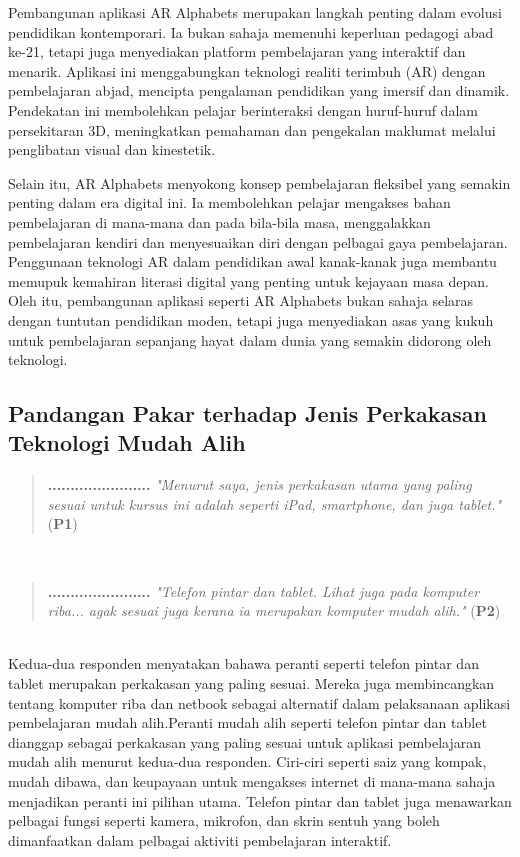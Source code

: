{{Pembangunan aplikasi AR Alphabets merupakan langkah penting dalam evolusi pendidikan kontemporari. Ia bukan sahaja memenuhi keperluan pedagogi abad ke-21, tetapi juga menyediakan platform pembelajaran yang interaktif dan menarik. Aplikasi ini menggabungkan teknologi realiti terimbuh (AR) dengan pembelajaran abjad, mencipta pengalaman pendidikan yang imersif dan dinamik. Pendekatan ini membolehkan pelajar berinteraksi dengan huruf-huruf dalam persekitaran 3D, meningkatkan pemahaman dan pengekalan maklumat melalui penglibatan visual dan kinestetik.

Selain itu, AR Alphabets menyokong konsep pembelajaran fleksibel yang semakin penting dalam era digital ini. Ia membolehkan pelajar mengakses bahan pembelajaran di mana-mana dan pada bila-bila masa, menggalakkan pembelajaran kendiri dan menyesuaikan diri dengan pelbagai gaya pembelajaran. Penggunaan teknologi AR dalam pendidikan awal kanak-kanak juga membantu memupuk kemahiran literasi digital yang penting untuk kejayaan masa depan. Oleh itu, pembangunan aplikasi seperti AR Alphabets bukan sahaja selaras dengan tuntutan pendidikan moden, tetapi juga menyediakan asas yang kukuh untuk pembelajaran sepanjang hayat dalam dunia yang semakin didorong oleh teknologi.

\subsection{Pandangan Pakar terhadap Jenis Perkakasan Teknologi Mudah Alih}

\begin{quote}\begin{center}\textbf{.......................} \textit{"Menurut saya, jenis perkakasan utama yang paling sesuai untuk kursus ini adalah seperti iPad, smartphone, dan juga tablet."} (\textbf{P1})\end{center}\end{quote}\\
\begin{quote}
\begin{center}
\textbf{.......................} \textit{"Telefon pintar dan tablet. Lihat juga pada komputer riba... agak sesuai juga kerana ia merupakan komputer mudah alih."} (\textbf{P2})\end{center}
\end{quote}\\

Kedua-dua responden menyatakan bahawa peranti seperti telefon pintar dan tablet merupakan perkakasan yang paling sesuai. Mereka juga membincangkan tentang komputer riba dan netbook sebagai alternatif dalam pelaksanaan aplikasi pembelajaran mudah alih.Peranti mudah alih seperti telefon pintar dan tablet dianggap sebagai perkakasan yang paling sesuai untuk aplikasi pembelajaran mudah alih menurut kedua-dua responden. Ciri-ciri seperti saiz yang kompak, mudah dibawa, dan keupayaan untuk mengakses internet di mana-mana sahaja menjadikan peranti ini pilihan utama. Telefon pintar dan tablet juga menawarkan pelbagai fungsi seperti kamera, mikrofon, dan skrin sentuh yang boleh dimanfaatkan dalam pelbagai aktiviti pembelajaran interaktif.

}}
